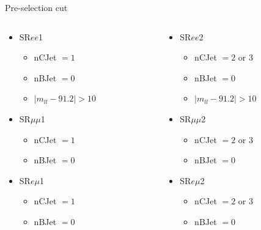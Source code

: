\documentclass[mathserif,serif]{beamer}
\begin{document}
\begin{frame}{Pre-selection cut}
\normalsize
\begin{columns}
\begin{column}{0.5\textwidth}

\begin{itemize}
\item SR$ee$1
\begin{itemize}
\item nCJet $=1$
\item nBJet $=0$
\item $|m_{ll} - 91.2| > 10$
\end{itemize}
\item SR$\mu\mu$1
\begin{itemize}
\item nCJet $=1$
\item nBJet $=0$
\end{itemize}
\item SR$e\mu$1
\begin{itemize}
\item nCJet $=1$
\item nBJet $=0$
\end{itemize}
\end{itemize}

\end{column}
\begin{column}{0.5\textwidth}

\begin{itemize}
\item SR$ee$2
\begin{itemize}
\item nCJet $=2$ or $3$
\item nBJet $=0$
\item $|m_{ll} - 91.2| > 10$
\end{itemize}
\item SR$\mu\mu$2
\begin{itemize}
\item nCJet $=2$ or $3$
\item nBJet $=0$
\end{itemize}
\item SR$e\mu$2
\begin{itemize}
\item nCJet $=2$ or $3$
\item nBJet $=0$
\end{itemize}
\end{itemize}

\end{column}
\end{columns}
\end{frame}
\end{document}
